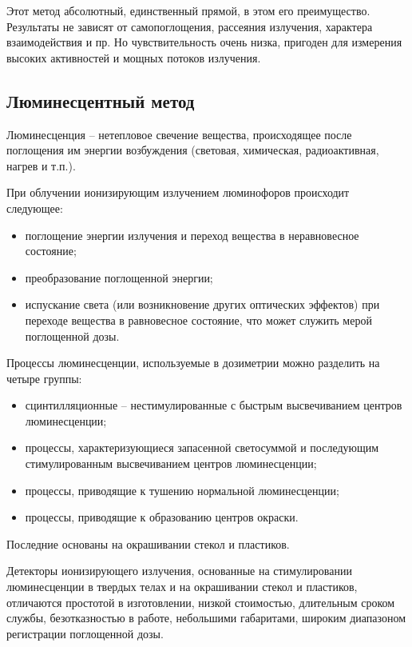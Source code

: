 \documentclass[14pt,pscyr,titlepage]{hedreport}
\begin{document}
		Этот метод абсолютный, единственный прямой, в этом его преимущество. 
		Результаты не зависят от самопоглощения, рассеяния излучения, характера 
		взаимодействия и пр. Но чувствительность очень низка, пригоден для 
		измерения высоких активностей и мощных потоков излучения.

	\subsection{Люминесцентный метод}
		Люминесценция -- нетепловое свечение вещества, происходящее после 
		поглощения им энергии возбуждения (световая, химическая, 
		радиоактивная, нагрев и т.п.).

		При облучении ионизирующим излучением люминофоров происходит следующее:
		\begin{itemize}\itemsep-2pt
			\item поглощение энергии излучения и переход вещества в 
				неравновесное состояние;
			\item преобразование поглощенной энергии;
			\item испускание света (или возникновение других оптических 
				эффектов) при переходе вещества в равновесное состояние, 
				что может служить мерой поглощенной дозы.
		\end{itemize}

		Процессы люминесценции, используемые в дозиметрии можно разделить 
		на четыре группы:
		\begin{itemize}\itemsep-2pt
			\item сцинтилляционные -- нестимулированные с быстрым 
				высвечиванием центров люминесценции;
			\item процессы, характеризующиеся запасенной светосуммой и 
				последующим стимулированным высвечиванием центров 
				люминесценции;
			\item процессы, приводящие к тушению нормальной люминесценции;
			\item процессы, приводящие к образованию центров окраски.
		\end{itemize}

		Последние основаны на окрашивании стекол и пластиков.

		Детекторы ионизирующего излучения, основанные на стимулировании 
		люминесценции в твердых телах и на окрашивании стекол и пластиков, 
		отличаются простотой в изготовлении, низкой стоимостью, длительным 
		сроком службы, безотказностью в работе, небольшими габаритами, широким 
		диапазоном регистрации поглощенной дозы.
\end{document}
